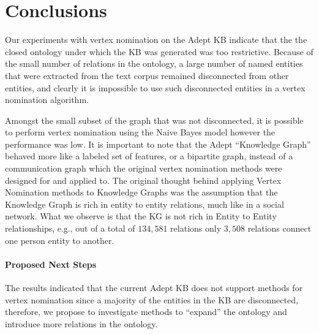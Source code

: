 \documentclass[paper=a4,fontsize=11pt]{scrartcl}
\newcommand{\eg}{e.g.,\xspace}
\numberwithin{equation}{section}    %
\numberwithin{figure}{section}      %
\numberwithin{table}{section}       %
\begin{document}
\section{Conclusions}
\label{sec:conclusions}
Our experiments with vertex nomination on the Adept KB indicate that
the the closed ontology under which the KB was generated was too restrictive.
Because of the small number of relations in the ontology, a
large number of named entities that were extracted from the text corpus
remained disconnected from other entities, and clearly it is impossible to
use such disconnected entities in a vertex nomination algorithm.

Amongst the small subset of the graph that was not disconnected, it is possible
to perform vertex nomination using the Naive Bayes model however the performance
was low. It is important to note that the Adept ``Knowledge Graph'' behaved more
like a labeled set of features, or a bipartite graph, instead of a communication
graph which the original vertex nomination methods were designed for and applied
to. {The original thought behind applying Vertex Nomination methods to Knowledge
  Graphs was the assumption that the Knowledge Graph is rich in entity to entity
  relations, much like in a social network. What
we observe is that the KG is not rich in Entity to Entity relationships, \eg out
of a total of $134,581$ relations only $3,508$ relations connect one person
entity to another.}

\paragraph{Proposed Next Steps}\label{sec:proposed}
The results indicated that the current Adept KB does not support methods
for vertex nomination since a majority of the entities in the KB are
disconnected, therefore, we propose to investigate
methods to ``expand'' the ontology and introduce more relations in the ontology.
\end{document}
